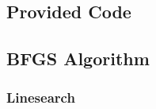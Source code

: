 \documentclass[a4paper,11pt]{article}
\begin{document}
\subsection*{Provided Code}

\clearpage
\subsection*{BFGS Algorithm}

\clearpage
\subsubsection*{Linesearch}

\clearpage


\clearpage

\end{document}
